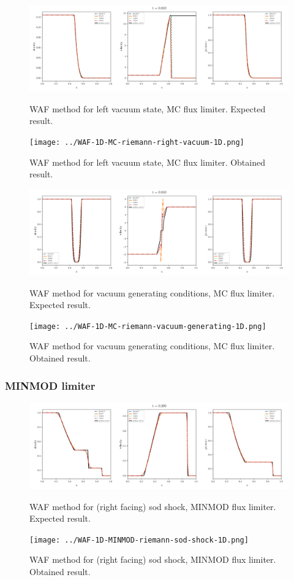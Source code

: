     \begin{figure}[htbp]
        \centering
        \includegraphics[width=.9\textwidth]{./figures/WAF-1D-MC-riemann-right-vacuum-1D.png}%
        \caption{WAF method for left vacuum state, MC flux limiter. Expected result.}
        \texttt{[image: ../WAF-1D-MC-riemann-right-vacuum-1D.png]}
        \caption{WAF method for left vacuum state, MC flux limiter. Obtained result.}
    \end{figure}


    \begin{figure}[htbp]
        \centering
        \includegraphics[width=.9\textwidth]{./figures/WAF-1D-MC-riemann-vacuum-generating-1D.png}%
        \caption{WAF method for vacuum generating conditions, MC flux limiter. Expected result.}
        \texttt{[image: ../WAF-1D-MC-riemann-vacuum-generating-1D.png]}%
        \caption{WAF method for vacuum generating conditions, MC flux limiter. Obtained result.}
    \end{figure}








\clearpage
\subsubsection{MINMOD limiter}

    \begin{figure}[htbp]
        \centering
        \includegraphics[width=.9\textwidth]{./figures/WAF-1D-MINMOD-riemann-sod-shock-1D.png}%
        \caption{WAF method for (right facing) sod shock, MINMOD flux limiter. Expected result.}
        \texttt{[image: ../WAF-1D-MINMOD-riemann-sod-shock-1D.png]}%
        \caption{WAF method for (right facing) sod shock, MINMOD flux limiter. Obtained result.}
    \end{figure}


